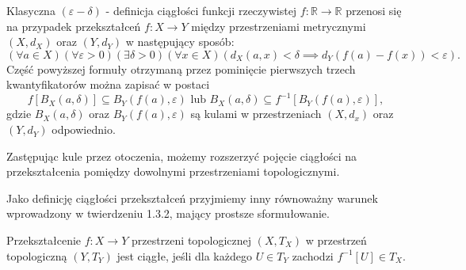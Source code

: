 Klasyczna $\left( \varepsilon - \delta \right) $ - definicja ciągłości funkcji rzeczywistej $f: \mathbb{R}\to\mathbb{R}$ przenosi się na przypadek przekształceń $f: X \to Y $ między przestrzeniami metrycznymi  $\left( X, d_{X} \right) $ oraz $\left( Y, d_{Y} \right) $ w następujący sposób:
\[
\left(\forall a \in X \right)\left(\forall \varepsilon > 0 \right)\left(\exists \delta >0 \right)\left(\forall x \in X \right) \left( d_{X}\left( a,x \right) < \delta \implies d_{Y}\left( f\left( a \right) - f\left( x \right)  \right) < \varepsilon  \right)     
.\] 
Część powyższej formuły otrzymaną przez pominięcie pierwszych trzech kwantyfikatorów można zapisać w postaci 
\[
f\left[ B_{X}\left( a, \delta \right)  \right] \subseteq B_{Y}\left( f\left( a \right) , \varepsilon  \right) \text{ lub } B_{X}\left( a,\delta \right) \subseteq f^{-1}\left[ B_{Y}\left( f\left( a \right) , \varepsilon  \right)  \right] 
,\] 
gdzie $B_{X}\left( a, \delta \right) $ oraz $B_{Y}\left( f\left( a \right) ,\varepsilon  \right) $ są kulami w przestrzeniach $\left( X, d_{x} \right) $ oraz $\left( Y, d_{Y} \right) $ odpowiednio.

Zastępując kule przez otoczenia, możemy rozszerzyć pojęcie ciągłości na przekształcenia pomiędzy dowolnymi przestrzeniami topologicznymi.

Jako definicję ciągłości przekształceń przyjmiemy inny równoważny warunek wprowadzony w twierdzeniu 1.3.2, mający prostsze sformułowanie.

\begin{definition}
	Przekształcenie $f: X \to Y$ przestrzeni topologicznej $\left( X, T_{X} \right) $ w przestrzeń topologiczną $\left( Y, T_{Y} \right) $ jest ciągłe, jeśli dla każdego $U \in T_{Y}$ zachodzi $f^{-1}\left[ U \right] \in T_{X} $.
\end{definition} 

